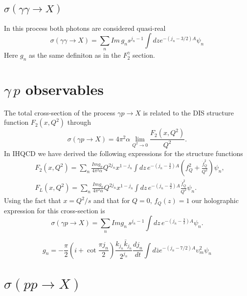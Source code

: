 \documentclass[preprint, 12pt]{elsarticle}
\begin{document}
\subsection{$\sigma\left(\gamma \gamma \rightarrow X\right)$}
In this process both photons are considered quasi-real
\begin{equation}
\sigma\left(\gamma \gamma \rightarrow X\right) = \sum_n Im \, g_n s^{j_n - 1} \int dz e^{- \left( j_n - 3/2\right) A}  \psi_n
\end{equation}
Here $g_n$ as the same definiton as in the $F_2^\gamma$ section.

\section{$\gamma\, p$ observables}

The total cross-section of the process $\gamma p \rightarrow X$ is related to the DIS structure function $F_2\left(x, Q^2\right)$ through
\begin{equation}
\sigma\left(\gamma p \rightarrow X\right) = 4 \pi^2 \alpha \lim_{Q^2 \rightarrow 0} \frac{F_2\left(x, Q^2\right)}{Q^2}.
\end{equation}
In IHQCD we have derived the following expressions for the structure functions
\begin{align}
&F_2(x, Q^2) = \sum_{n} \frac{ Im g_n}{4 \pi^2 \alpha} Q^{2 j_n} x^{1-j_n} \int dz \,e^{-\left(j_n-\frac{3}{2}\right)A}  \left( f_Q^2  +  \frac{\dot{f}_Q^{2}}{Q^2}      \right) \psi_n , \\
&F_L(x, Q^2) = \sum_{n} \frac{Im g_n}{4 \pi^2 \alpha} Q^{2 j_n} x^{1-j_n} \int dz \,e^{-\left(j_n-\frac{3}{2}\right)A}  \frac{\dot{f}_Q^{2}}{Q^2}  \psi_n.
\end{align}
Using the fact that $x = Q^2 / s$ and that for $Q = 0, \, f_Q\left(z\right) = 1$ our holographic expression for this cross-section is
\begin{equation}
\sigma\left(\gamma p \rightarrow X\right) =  \sum_{n} Im g_n \, s^{j_n -1 } \int dz \,e^{-\left(j_n-\frac{3}{2}\right)A}  \psi_n.
\end{equation}

\begin{equation}
g_n = - \frac{\pi}{2} \left( i + \cot \frac{\pi j_n}{2} \right) \frac{k_{j_n} \bar{k}_{j_n}}{2^{j_n}} \frac{d j_n}{dt} \int d\bar{z} e^{-\left(j_n - 7/2 \right)A} \upsilon_m^2 \psi_n
\end{equation}

\section{$\sigma\left(p p \rightarrow X\right)$}
\end{document}
